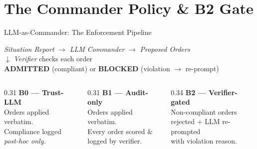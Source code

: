 \documentclass[aspectratio=169, 10pt]{beamer}
\begin{document}
\section{The Commander Policy \& B2 Gate}

\begin{frame}{LLM-as-Commander: The Enforcement Pipeline}

  \begin{center}
  \begin{center}
  \small
  \textit{Situation Report} $\to$ \textit{LLM Commander} $\to$ \textit{Proposed Orders}\\[0.3em]
  $\downarrow$ \quad \textit{Verifier} checks each order \\[0.3em]
  \textcolor{ROEGreen}{\textbf{ADMITTED}} (compliant) \quad or \quad
  \textcolor{ROERed}{\textbf{BLOCKED}} (violation $\to$ re-prompt)
\end{center}
  \end{center}

  \vspace{0.3em}
  \begin{columns}[T]
    \begin{column}{0.31\textwidth}
      \centering
      \textbf{B0 --- Trust-LLM}\\[0.3em]
      Orders applied verbatim.\\
      Compliance logged\\
      \emph{post-hoc only.}
    \end{column}
    \begin{column}{0.31\textwidth}
      \centering
      \textbf{B1 --- Audit-only}\\[0.3em]
      Orders applied verbatim.\\
      Every order scored \&\\
      logged by verifier.
    \end{column}
    \begin{column}{0.34\textwidth}
      \centering
      \textbf{B2 --- Verifier-gated}\\[0.3em]
      Non-compliant orders\\
      \alert{rejected} + LLM re-prompted\\
      with violation reason.
    \end{column}
  \end{columns}
\end{frame}
\end{document}
